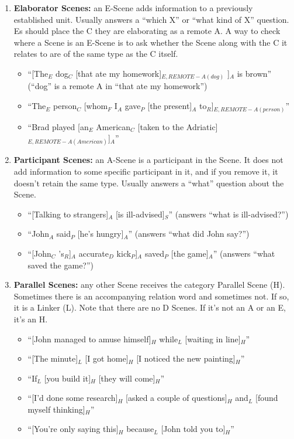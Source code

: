 \documentclass[11pt]{article}
\begin{document}
\begin{enumerate}
\item
\textbf{Elaborator Scenes:} an E-Scene adds information to a previously established unit. Usually answers a ``which X'' or ``what kind of X'' question. Es should place the C they are elaborating as a remote A. A way to check where a Scene is an E-Scene is to ask whether the Scene along with the C it relates to are of the same type as the C itself.
\begin{itemize}
\item
``[The$_E$ dog$_C$ [that ate my homework]$_{E, REMOTE-A(dog)}$ ]$_A$ is brown'' (``dog'' is a remote A in ``that ate my homework'')
\item
``The$_E$ person$_C$ [whom$_F$ I$_A$ gave$_P$ [the present]$_A$ to$_R$]$_{E,REMOTE-A(person)}$''
\item
``Brad played [an$_E$ American$_C$ [taken to the Adriatic]$_{E,REMOTE-A(American)}$]$_A$''
\end{itemize}

\item
\textbf{Participant Scenes:} an A-Scene is a participant in the Scene. It does not add information to some specific participant in it, and if you remove it, it doesn't retain the same type. Usually answers a ``what'' question about the Scene.

\begin{itemize}
\item
``[Talking to strangers]$_A$ [is ill-advised]$_S$'' (answers ``what is ill-advised?'')
\item
``John$_A$ said$_P$ [he's hungry]$_A$'' (answers ``what did John say?'')
\item
``[John$_C$ 's$_R$]$_A$ accurate$_D$ kick$_P$]$_A$ saved$_P$ [the game]$_A$'' (answers ``what saved the game?'')
\end{itemize}

\item
{\bf Parallel Scenes:} any other Scene receives the category Parallel Scene (H). Sometimes there is an accompanying relation word and sometimes not. If so, it is a Linker (L). Note that there are no D Scenes. If it's not an A or an E, it's an H.

\begin{itemize}
\item
``[John managed to amuse himself]$_H$ while$_L$ [waiting in line]$_H$''
\item
``[The minute]$_L$ [I got home]$_H$ [I noticed the new painting]$_H$''
\item
``If$_L$ [you build it]$_H$ [they will come]$_H$''
\item
``[I'd done some research]$_H$ [asked a couple of questions]$_H$ and$_L$ [found myself thinking]$_H$''
\item
``[You're only saying this]$_H$ because$_L$ [John told you to]$_H$''
\end{itemize}


\end{enumerate}
\end{document}
